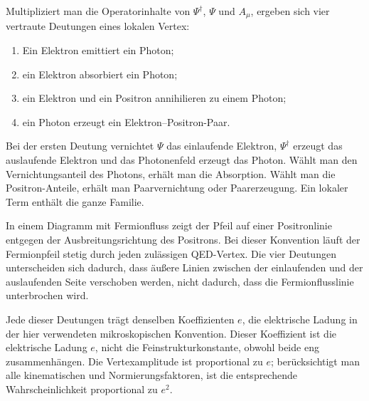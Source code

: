 \begin{classroomqa}
\end{classroomqa}

Multipliziert man die Operatorinhalte von \(\Psi^\dagger\), \(\Psi\) und \(A_\mu\), ergeben sich vier vertraute Deutungen eines lokalen Vertex:
\begin{enumerate}
\item Ein Elektron emittiert ein Photon;
\item ein Elektron absorbiert ein Photon;
\item ein Elektron und ein Positron annihilieren zu einem Photon;
\item ein Photon erzeugt ein Elektron--Positron-Paar.
\end{enumerate}
Bei der ersten Deutung vernichtet \(\Psi\) das einlaufende Elektron, \(\Psi^\dagger\) erzeugt das auslaufende Elektron und das Photonenfeld erzeugt das Photon. Wählt man den Vernichtungsanteil des Photons, erhält man die Absorption. Wählt man die Positron-Anteile, erhält man Paarvernichtung oder Paarerzeugung. Ein lokaler Term enthält die ganze Familie.

In einem Diagramm mit Fermionfluss zeigt der Pfeil auf einer Positronlinie entgegen der Ausbreitungsrichtung des Positrons. Bei dieser Konvention läuft der Fermionpfeil stetig durch jeden zulässigen QED-Vertex. Die vier Deutungen unterscheiden sich dadurch, dass äußere Linien zwischen der einlaufenden und der auslaufenden Seite verschoben werden, nicht dadurch, dass die Fermionflusslinie unterbrochen wird.

Jede dieser Deutungen trägt denselben Koeffizienten \(e\), die elektrische Ladung in der hier verwendeten mikroskopischen Konvention. Dieser Koeffizient ist die elektrische Ladung \(e\), nicht die Feinstrukturkonstante, obwohl beide eng zusammenhängen. Die Vertexamplitude ist proportional zu \(e\); berücksichtigt man alle kinematischen und Normierungsfaktoren, ist die entsprechende Wahrscheinlichkeit proportional zu \(e^2\).

\begin{classroomqa}
\end{classroomqa}

